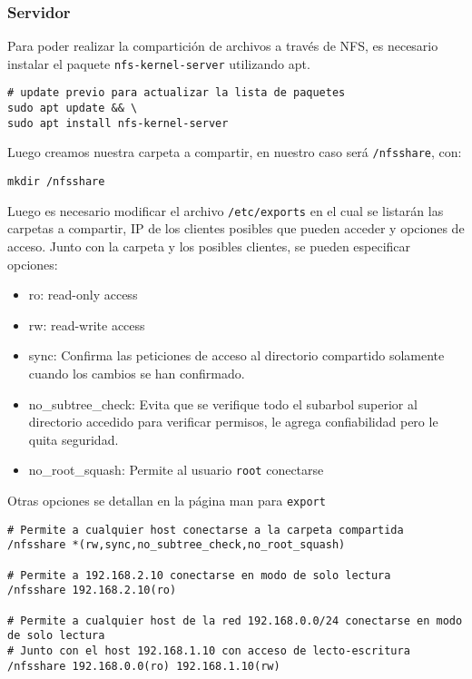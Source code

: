 \subsubsection{Servidor}

Para poder realizar la compartición de archivos a través de NFS, es necesario instalar el paquete \texttt{nfs-kernel-server} utilizando apt.

\begin{lstlisting}[bash]
# update previo para actualizar la lista de paquetes
sudo apt update && \
sudo apt install nfs-kernel-server
\end{lstlisting}

Luego creamos nuestra carpeta a compartir, en nuestro caso será \texttt{/nfsshare}, con:

\begin{lstlisting}[bash]
mkdir /nfsshare
\end{lstlisting}

Luego es necesario modificar el archivo \texttt{/etc/exports} en el cual se listarán las carpetas a compartir, IP de los clientes posibles que pueden acceder y opciones de acceso. Junto con la carpeta y los posibles clientes, se pueden especificar opciones:

\begin{itemize}
    \item ro: read-only access
    \item rw: read-write access
    \item sync: Confirma las peticiones de acceso al directorio compartido solamente cuando los cambios se han confirmado.
    \item no\_subtree\_check: Evita que se verifique todo el subarbol superior al directorio accedido para verificar permisos, le agrega confiabilidad pero le quita seguridad. 
    \item no\_root\_squash: Permite al usuario \texttt{root} conectarse
\end{itemize}

    Otras opciones se detallan en la página man para \texttt{export} 

\begin{lstlisting}[bash]
# Permite a cualquier host conectarse a la carpeta compartida
/nfsshare *(rw,sync,no_subtree_check,no_root_squash)

# Permite a 192.168.2.10 conectarse en modo de solo lectura
/nfsshare 192.168.2.10(ro)

# Permite a cualquier host de la red 192.168.0.0/24 conectarse en modo de solo lectura
# Junto con el host 192.168.1.10 con acceso de lecto-escritura
/nfsshare 192.168.0.0(ro) 192.168.1.10(rw)
\end{lstlisting}

